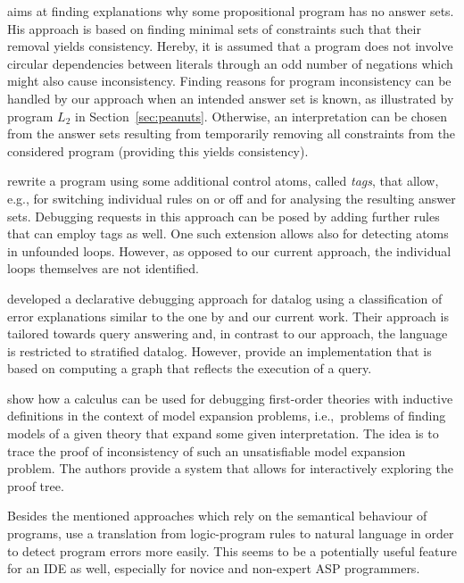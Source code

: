 \documentclass{tlp}
\newcommand{\iec}{i.e.,\ }
\begin{document}
 aims at finding explanations why some propositional program has no answer sets. 
His approach is based on finding minimal sets of constraints such that their removal yields consistency.
Hereby, it is assumed that a program does not involve circular dependencies
between literals through an odd number of negations which might also cause inconsistency.
Finding reasons for program inconsistency can be  handled by our approach when an intended answer set is known, as illustrated by program $L_2$ in Section~\ref{sec:peanuts}.
Otherwise, an interpretation can be chosen from the answer sets resulting from temporarily removing all constraints from the considered program (providing this yields consistency). 


 rewrite a program using some additional control
atoms, called \emph{tags}, that allow, e.g., for switching individual rules on or off and for analysing the resulting answer sets.
Debugging requests in this approach can be posed by adding further rules that can employ tags as well.
One such extension allows also for detecting atoms in unfounded loops.
However, as opposed to our current approach, the individual loops themselves are not identified.

 developed a declarative debugging approach for datalog
using a classification of error explanations similar to the one by  and our current work.
Their approach is tailored towards query answering  and,
in contrast to our approach, the language is restricted to stratified datalog. 
However,  provide an implementation that is based on computing
a graph that reflects the execution of a query.


 show how a calculus can be used for
debugging  first-order theories with inductive definitions in the context of model expansion problems, \iec problems of finding models of a given theory that expand some given interpretation. 
The idea is to trace the proof of inconsistency of such an unsatisfiable model expansion problem.
The authors provide a system that allows for interactively exploring the proof tree.

Besides the mentioned approaches which rely on the semantical behaviour of programs,  \citeyear{mirek07} use a translation from logic-program rules to natural language in order to detect program errors more easily.
This seems to be a potentially useful feature for an IDE as well, especially for novice and non-expert ASP programmers.
\end{document}
